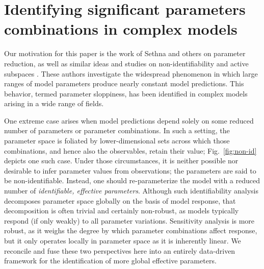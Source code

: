 

\chapter{Identifying significant parameters combinations in complex
  models\label{ch:params}}




Our motivation for this paper is the work of Sethna and others on
parameter reduction\cite{AS06}, as well as similar ideas and studies
on non-identifiability \cite{RKMBSKT09} and active subspaces
\cite{CDW14}. These authors investigate the widespread phenomenon in
which large ranges of model parameters produce nearly constant model
predictions. This behavior, termed parameter sloppiness, has been
identified in complex models arising in a wide range of fields.

One extreme case arises when model predictions depend solely on some
reduced number of parameters or parameter combinations.  In such a
setting, the parameter space is foliated by lower-dimensional sets
across which those combinations, and hence also the observables,
retain their value; Fig.~\ref{fig:non-id} depicts one such case.
Under those circumstances, it is neither possible nor desirable to
infer parameter values from observations; the parameters are said to
be non-identifiable. Instead, one should re-parameterize the model
with a reduced number of \emph{identifiable, effective parameters}.
Although such identifiability analysis decomposes parameter space
globally on the basis of model response, that decomposition is often
trivial and certainly non-robust, as models typically respond (if only
weakly) to all parameter variations.  Sensitivity analysis is more
robust, as it weighs the degree by which parameter combinations affect
response, but it only operates locally in parameter space as it is
inherently linear. We reconcile and fuse these two perspectives here
into an entirely data-driven framework for the identification of more
global effective parameters.

